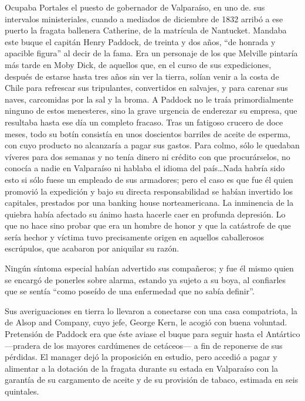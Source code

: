 \documentclass[10pt,twoside,openright]{memoir}
\begin{document}
Ocupaba Portales el puesto de
gobernador de Valparaíso, en uno de. sus intervalos ministeriales,
cuando a mediados de diciembre de 1832 arribó a ese puerto la fragata
ballenera Catherine, de la matrícula de Nantucket. Mandaba este buque el
capitán Henry Paddock, de treinta y dos años, ``de honrada y apacible
figura'' al decir de la fama. Era un personaje de los que Melville
pintaría más tarde en Moby Dick, de aquellos que, en el curso de sus
expediciones, después de estarse hasta tres años sin ver la tierra,
solían venir a la costa de Chile para refrescar sus tripulantes,
convertidos en salvajes, y para carenar sus naves, carcomidas por la sal
y la broma. A Paddock no le traía primordialmente ninguno de estos
menesteres, sino la grave urgencia de enderezar su empresa, que
resultaba
hasta ese día un completo fracaso. Tras un fatigoso crucero de doce
meses, todo su botín consistía en unos doscientos barriles de aceite de
esperma, con cuyo producto no alcanzaría a pagar sus gastos. Para colmo,
sólo le quedaban víveres para dos semanas y no tenía dinero ni crédito
con que procurárselos, no conocía a nadie en Valparaíso ni hablaba el
idioma del país\ldots Nada habría sido esto si sólo fuese un empleado de
sus armadores; pero el caso es que fue él quien promovió la expedición y
bajo su directa responsabilidad se habían invertido los capitales,
prestados por una banking house norteamericana. La inminencia de la
quiebra había afectado su ánimo hasta hacerle caer en profunda
depresión. Lo que no hace sino probar que era un hombre de honor y que
la catástrofe de que sería hechor y víctima tuvo precisamente origen en
aquellos caballerosos escrúpulos, que acabaron por aniquilar su razón.

Ningún síntoma especial habían advertido sus compañeros; y fue él mismo
quien se encargó de ponerles sobre alarma, estando ya sujeto a su boya,
al confiarles que se sentía ``como poseído de una enfermedad que no sabía
definir''.

Sus averiguaciones en tierra lo llevaron a conectarse con una casa
compatriota, la de Alsop and Company, cuyo jefe, George Kern, le acogió
con buena voluntad. Pretensión de Paddock era que éste aviase el buque
para seguir hasta el Antártico ---pradera de los mayores cardúmenes de
cetáceos--- a fin de reponerse de sus pérdidas. El manager dejó la
proposición en estudio, pero accedió a pagar y alimentar a la dotación
de la fragata durante su estada en Valparaíso con la garantía de su
cargamento de aceite y de su provisión de tabaco, estimada en seis
quintales.
\end{document}
